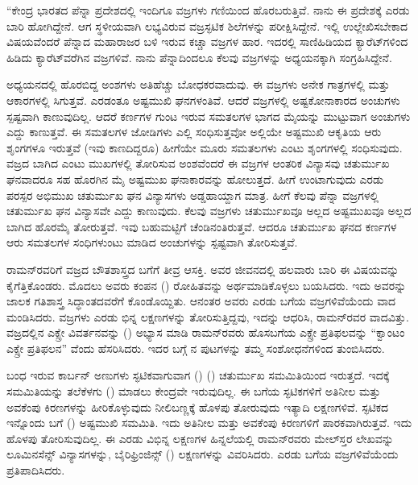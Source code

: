 \enginline{-}“ಕೇಂದ್ರ ಭಾರತದ ಪೆನ್ನಾ ಪ್ರದೇಶದಲ್ಲಿ ಇಂದಿಗೂ ವಜ್ರಗಳು ಗಣಿಯಿಂದ ಹೊರಬರುತ್ತಿವೆ. ನಾನು ಈ ಪ್ರದೇಶಕ್ಕೆ ಎರಡು ಬಾರಿ ಹೋಗಿದ್ದೇನೆ. ಆಗ ಸ್ಥಳೀಯವಾಗಿ ಲಭ್ಯವಿರುವ ವಜ್ರ\enginline{-}ಸ್ಫಟಿಕ ಶಿಲೆಗಳನ್ನು ಪರೀಕ್ಷಿಸಿದ್ದೇನೆ. ಇಲ್ಲಿ ಉಲ್ಲೇಖಿಸಬೇಕಾದ ವಿಷಯವೆಂದರೆ ಪೆನ್ನಾದ ಮಹಾರಾಜರ ಬಳಿ ಇರುವ  ಕಚ್ಚಾ ವಜ್ರಗಳ ಹಾರ. ಇದರಲ್ಲಿ ಸಾಣಿಹಿಡಿಯದ  ಕ್ಯಾರೆಟ್‍ಗಳಿಂದ ಹಿಡಿದು  ಕ್ಯಾರೆಟ್‍ವರೆಗಿನ ವಜ್ರಗಳಿವೆ. ನಾನು ಪೆನ್ನಾದಿಂದಲೂ ಕೆಲವು ವಜ್ರಗಳನ್ನು ಅಧ್ಯಯನಕ್ಕಾಗಿ ಸಂಗ್ರಹಿಸಿದ್ದೇನೆ.

ಅಧ್ಯಯನದಲ್ಲಿ ಹೊರಬಿದ್ದ ಅಂಶಗಳು ಅತಿಹೆಚ್ಚು ಬೋಧಕರವಾದುವು. ಈ ವಜ್ರಗಳು ಅನೇಕ ಗಾತ್ರಗಳಲ್ಲಿ ಮತ್ತು ಆಕಾರಗಳಲ್ಲಿ ಸಿಗುತ್ತವೆ. ಎರಡಂತೂ ಅಷ್ಟಮುಖಿ ಘನಗಳಂತಿವೆ. ಆದರೆ ವಜ್ರಗಳಲ್ಲಿ ಅಷ್ಟಕೋನಾಕಾರದ ಅಂಚುಗಳು ಸ್ಪಷ್ಟವಾಗಿ ಕಾಣುವುದಿಲ್ಲ. ಆದರೆ ಕರ್ಣಗಳ ಗುಂಟ ಇರುವ ಸಮತಲಗಳ ಭಾಗದ ಮೈಯನ್ನು ಮುಟ್ಟುವಾಗ ಅಂಚುಗಳು ಎದ್ದು ಕಾಣುತ್ತವೆ. ಈ ಸಮತಲಗಳ ಜೋಡಿಗಳು ಎಲ್ಲಿ ಸಂಧಿಸುತ್ತವೋ ಅಲ್ಲಿಯೇ ಅಷ್ಟಮುಖಿ ಆಕೃತಿಯ ಆರು ಶೃಂಗಗಳೂ ಇರುತ್ತವೆ (ಇವು ಕಾಣದಿದ್ದರೂ) ಹೀಗೆಯೇ ಮೂರು ಸಮತಲಗಳು ಎಂಟು ಶೃಂಗಗಳಲ್ಲಿ ಸಂಧಿಸುವುದು. ವಜ್ರದ ಬಾಗಿದ ಎಂಟು ಮುಖಗಳಲ್ಲಿ ತೋರಿಸುವ ಅಂಶವೆಂದರೆ ಈ ವಜ್ರಗಳ ಆಂತರಿಕ ವಿನ್ಯಾಸವು ಚತುರ್ಮುಖ ಘನವಾದರೂ ಸಹ ಹೊರಗಿನ ಮೈ ಅಷ್ಟಮುಖ ಘನಾಕಾರವನ್ನು ಹೋಲುತ್ತದೆ. ಹೀಗೆ ಉಂಟಾಗುವುದು  ಎರಡು ಪರಸ್ಪರ ಅಭಿಮುಖ ಚತುರ್ಮುಖ ಘನ ವಿನ್ಯಾಸಗಳು ಅಡ್ಡಹಾಯ್ದಾಗ ಮಾತ್ರ. ಹೀಗೆ ಕೆಲವು ಪೆನ್ನಾ ವಜ್ರಗಳಲ್ಲಿ ಚತುರ್ಮುಖ ಘನ ವಿನ್ಯಾಸವೇ ಎದ್ದು ಕಾಣುವುದು. ಕೆಲವು ವಜ್ರಗಳು ಚತುರ್ಮುಖವೂ ಅಲ್ಲದ ಅಷ್ಟಮುಖವೂ ಅಲ್ಲದ ಬಾಗಿದ ಹೊರಮೈ ತೋರುತ್ತವೆ. ಇವು ಬಹುಮಟ್ಟಿಗೆ ಚೆಂಡಿನಂತಿರುತ್ತವೆ. ಆದರೂ ಚತುರ್ಮುಖ ಘನದ ಕರ್ಣಗಳ ಆರು ಸಮತಲಗಳ ಸಂಧಿಗಳುಂಟು ಮಾಡಿದ ಅಂಚುಗಳನ್ನು ಸ್ಪಷ್ಟವಾಗಿ ತೋರಿಸುತ್ತವೆ.



ರಾಮನ್‍ರವರಿಗೆ ವಜ್ರದ ಬೌತಶಾಸ್ತ್ರದ ಬಗೆಗೆ ತೀವ್ರ ಆಸಕ್ತಿ. ಅವರ ಜೀವನದಲ್ಲಿ ಹಲವಾರು ಬಾರಿ ಈ ವಿಷಯವನ್ನು ಕೈಗೆತ್ತಿಕೊಂಡರು. ಮೊದಲು ಅವರು ಕಂಪನ () ರೋಹಿತವನ್ನು ಅರ್ಥಮಾಡಿಕೊಳ್ಳಲು ಬಯಸಿದರು. ಇದು ಅವರನ್ನು ಜಾಲಕ ಗತಿಶಾಸ್ತ್ರ ಸಿದ್ಧಾಂತದವರೆಗೆ ಕೊಂಡೊಯ್ದಿತು. ಆನಂತರ ಅವರು ಎರಡು ಬಗೆಯ ವಜ್ರಗಳಿವೆಯೆಂದು ವಾದ ಮಂಡಿಸಿದರು. ವಜ್ರಗಳು ಎರಡು ಭಿನ್ನ ಲಕ್ಷಣಗಳನ್ನು ತೋರಿಸುತ್ತಿದ್ದವು, ಇದನ್ನು ಆಧರಿಸಿ, ರಾಮನ್‍ರವರ ವಾದವಿತ್ತು. ವಜ್ರದಲ್ಲಿನ ಎಕ್ಸ್\enginline{-}ರೇ ವಿವರ್ತನವನ್ನು () ಅಭ್ಯಾಸ ಮಾಡಿ ರಾಮನ್‍ರವರು ಹೊಸಬಗೆಯ ಎಕ್ಸ್\enginline{-}ರೇ ಪ್ರತಿಫಲವನ್ನು “ಕ್ವಾಂಟಂ ಎಕ್ಸ್\enginline{-}ರೇ ಪ್ರತಿಫಲನ” ವೆಂದು ಹೆಸರಿಸಿದರು. ಇದರ ಬಗ್ಗೆ \textit{}ನ ಪುಟಗಳನ್ನು ತಮ್ಮ ಸಂಶೋಧನೆಗಳಿಂದ ತುಂಬಿಸಿದರು.

 ಬಂಧ ಇರುವ ಕಾರ್ಬನ್ ಅಣುಗಳು ಸ್ಫಟಿಕವಾಗುವಾಗ () () ಚತುರ್ಮುಖ ಸಮಮಿತಿಯಿಂದ ಇರುತ್ತದೆ. ಇದಕ್ಕೆ ಸಮಮಿತಿಯನ್ನು ತಲೆಕೆಳಗು () ಮಾಡಲು ಕೇಂದ್ರವೇ ಇರುವುದಿಲ್ಲ. ಈ ಬಗೆಯ ಸ್ಫಟಿಕಗಳಿಗೆ ಅತಿನೀಲ ಮತ್ತು ಅವಕೆಂಪು ಕಿರಣಗಳನ್ನು ಹೀರಿಕೊಳ್ಳುವುದು ನೀಲಿಬಣ್ಣಕ್ಕೆ ಹೊಳಪು ತೋರುವುದು ಇತ್ಯಾದಿ ಲಕ್ಷಣಗಳಿವೆ. ಸ್ಫಟಿಕದ ಇನ್ನೊಂದು ಬಗೆ () ಅಷ್ಟಮುಖಿ ಸಮಮಿತಿ. ಇದು ಅತಿನೀಲ ಮತ್ತು ಅವಕೆಂಪು ಕಿರಣಗಳಿಗೆ ಪಾರಕವಾಗಿರುತ್ತವೆ. ಇದು ಹೊಳಪು ತೋರಿಸುವುದಿಲ್ಲ. ಈ ಎರಡು ವಿಭಿನ್ನ ಲಕ್ಷಣಗಳ ಹಿನ್ನಲೆಯಲ್ಲಿ ರಾಮನ್‍ರವರು ಮೇಲ್‍ಸ್ತರ ಲೇಖವನ್ನು ಲೂಮಿನಸೆನ್ಸ್ ವಿನ್ಯಾಸಗಳನ್ನು, ಬೈರಿಫ್ರಿಂಜಿನ್ಸ್ ()  ಲಕ್ಷಣಗಳನ್ನು ವಿವರಿಸಿದರು. ಎರಡು ಬಗೆಯ ವಜ್ರಗಳಿವೆಯೆಂದು ಪ್ರತಿಪಾದಿಸಿದರು.


